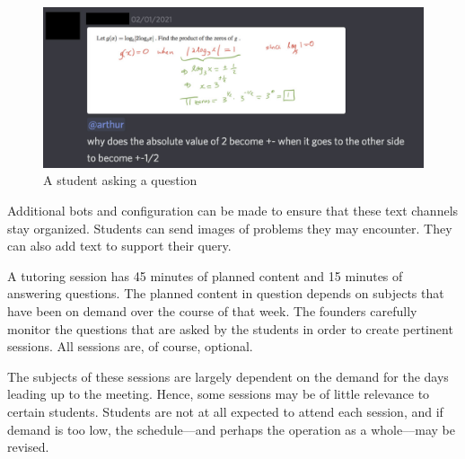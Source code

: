 \documentclass{business}
\begin{document}
    \begin{figure}[H]
        \centering
        \caption{A student asking a question}
        \label{ask-question}
        \includegraphics[scale=0.3]{images/ask-question.jpg}
    \end{figure}
    Additional bots and configuration can be made to ensure that these text channels stay organized. Students can send images of problems they may encounter. They can also add text to support their query.\par
    A tutoring session has 45 minutes of planned content and 15 minutes of answering questions. The planned content in question depends on subjects that have been on demand over the course of that week. The founders carefully monitor the questions that are asked by the students in order to create pertinent sessions. All sessions are, of course, optional.\par
    The subjects of these sessions are largely dependent on the demand for the days leading up to the meeting. Hence, some sessions may be of little relevance to certain students. Students are not at all expected to attend each session, and if demand is too low, the schedule––and perhaps the operation as a whole––may be revised.\par
\end{document}
